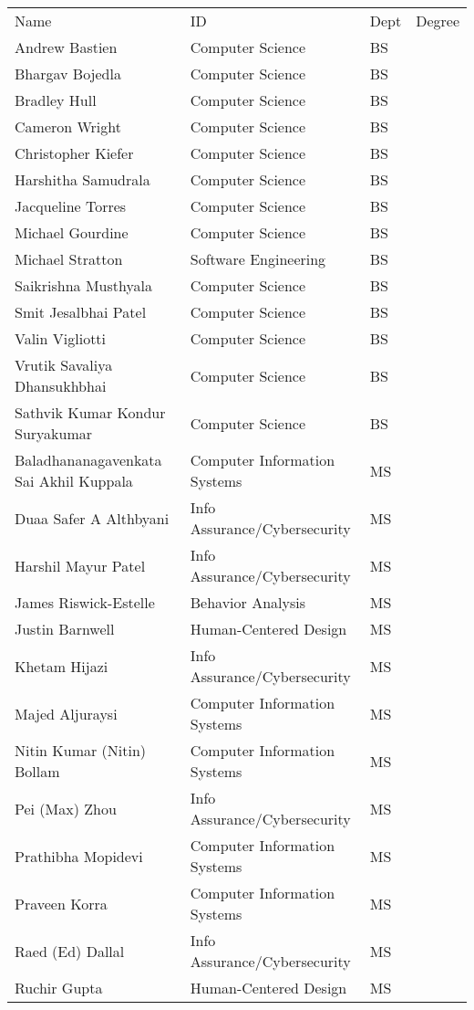 \begin{table}
\label{advising}
\center
\begin{tabular}{| l | l | l | l }
Name& ID & Dept & Degree \\
Andrew Bastien & Computer Science & BS \\
Bhargav Bojedla& Computer Science & BS \\
Bradley Hull& Computer Science & BS \\
Cameron Wright& Computer Science & BS \\
Christopher Kiefer& Computer Science & BS \\
Harshitha Samudrala& Computer Science & BS \\
Jacqueline Torres& Computer Science & BS \\
Michael Gourdine& Computer Science & BS \\
Michael Stratton& Software Engineering & BS \\
Saikrishna Musthyala& Computer Science & BS \\
Smit Jesalbhai Patel& Computer Science & BS \\
Valin Vigliotti& Computer Science & BS \\
Vrutik Savaliya Dhansukhbhai& Computer Science & BS \\
Sathvik Kumar Kondur Suryakumar& Computer Science & BS \\
Baladhananagavenkata Sai Akhil Kuppala& Computer Information Systems & MS \\
Duaa Safer A Althbyani& Info Assurance/Cybersecurity & MS \\
Harshil Mayur Patel& Info Assurance/Cybersecurity & MS \\
James Riswick-Estelle& Behavior Analysis & MS \\
Justin Barnwell& Human-Centered Design & MS \\
Khetam Hijazi& Info Assurance/Cybersecurity & MS \\
Majed Aljuraysi& Computer Information Systems & MS \\
Nitin Kumar (Nitin) Bollam& Computer Information Systems & MS \\
Pei (Max) Zhou& Info Assurance/Cybersecurity & MS \\
Prathibha Mopidevi& Computer Information Systems & MS \\
Praveen Korra& Computer Information Systems & MS \\
Raed (Ed) Dallal& Info Assurance/Cybersecurity & MS \\
Ruchir Gupta& Human-Centered Design & MS \\

\end{tabular}
\end{table}
